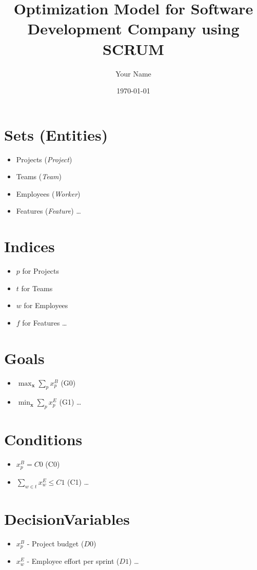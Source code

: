 \documentclass{article}
\title{Optimization Model for Software Development Company using SCRUM}
\author{Your Name}
\date{\today}
\begin{document}
\maketitle
\tableofcontents
\section{Sets (Entities)}
\begin{itemize}
    \item Projects (\textit{Project})
    \item Teams (\textit{Team})
    \item Employees (\textit{Worker})
    \item Features (\textit{Feature})
    \ldots
\end{itemize}
\section{Indices}
\begin{itemize}
    \item $p$ for Projects
    \item $t$ for Teams
    \item $w$ for Employees
    \item $f$ for Features
    \ldots
\end{itemize}
\section{Goals}
\begin{itemize}
    \item $\max_{\mathbf{x}}\sum_{p} x_p^B$ (G0)
    \item $\min_{\mathbf{x}}\sum_{p} x_p^{E}$ (G1)
    \ldots
\end{itemize}
\section{Conditions}
\begin{itemize}
    \item $x_p^B = C0$ (C0)
    \item $\sum_{w \in t} x_w^{E} \leq C1$ (C1)
    \ldots
\end{itemize}
\section{DecisionVariables}
\begin{itemize}
    \item $x_p^B$ - Project budget ($D0$)
    \item $x_w^{E}$ - Employee effort per sprint ($D1$)
    \ldots
\end{itemize}
\end{document}
